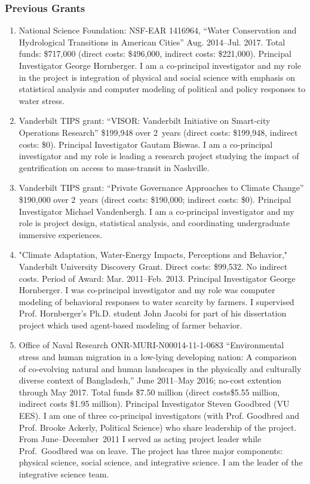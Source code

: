 \subsubsection{Previous Grants}
\begin{enumerate}
    \item National Science Foundation: NSF-EAR 1416964, ``Water Conservation and Hydrological Transitions in American Cities'' Aug. 2014--Jul. 2017. Total funds: \$717,000 (direct costs: \$496,000, indirect costs: \$221,000). Principal Investigator George Hornberger. I am a co-principal investigator and my role in the project is integration of physical and social science with emphasis on statistical analysis and computer modeling of political and policy responses to water stress.
    \item Vanderbilt TIPS grant: ``VISOR: Vanderbilt Initiative on Smart-city Operations Research'' \$199,948 over 2~years (direct costs: \$199,948, indirect costs: \$0). Principal Investigator Gautam Biswas. I am a co-principal investigator and my role is leading a research project studying the impact of gentrification on access to mass-transit in Nashville.
    \item Vanderbilt TIPS grant: ``Private Governance Approaches to Climate Change'' \$190,000 over 2~years (direct costs: \$190,000; indirect costs: \$0). Principal Investigator Michael Vandenbergh. I am a co-principal investigator and my role is project design, statistical analysis,
    and coordinating undergraduate immersive experiences.
	\item "Climate Adaptation, Water-Energy Impacts, Perceptions and Behavior," Vanderbilt University Discovery Grant. Direct costs: \$99,532. No indirect costs. Period of Award: Mar. 2011--Feb. 2013. Principal Investigator George Hornberger. I was co-principal investigator and my role was computer modeling of behavioral responses to water scarcity by farmers. I supervised Prof. Hornberger's Ph.D. student John Jacobi for part of his dissertation project which used agent-based modeling of farmer behavior.
	\item Office of Naval Research ONR-MURI-N00014-11-1-0683 ``Environmental stress and human migration in a low-lying developing nation: A comparison of co-evolving natural and human landscapes in the physically and culturally diverse context of Bangladesh,'' June 2011--May 2016; no-cost extention through May 2017. Total funds \$7.50 million (direct costs\$5.55 million, indirect costs \$1.95 million). Principal Investigator Steven Goodbred (VU EES). I am one of three co-principal investigators (with Prof. Goodbred and Prof. Brooke Ackerly, Political Science) who share leadership of the project. From June--December~2011 I served as acting project leader while Prof.~Goodbred was on leave. The project has three major components: physical science, social science, and integrative science. I am the leader of the integrative science team.

\end{enumerate}
